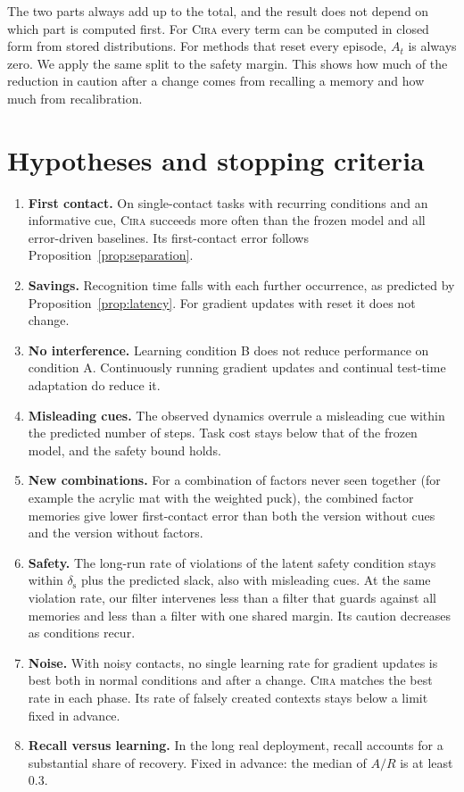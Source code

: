 \documentclass[10pt]{article}
\newcommand{\method}{\textsc{Cira}}
\begin{document}
The two parts always add up to the total, and the result does not depend on which part is computed
first. For \method{} every term can be computed in closed form from stored distributions. For methods
that reset every episode, $A_t$ is always zero. We apply the same split to the safety margin. This
shows how much of the reduction in caution after a change comes from recalling a memory and how much
from recalibration.

\section{Hypotheses and stopping criteria}

\begin{enumerate}[label=\textbf{H\arabic*},leftmargin=2.2em]
  \item \textbf{First contact.} On single-contact tasks with recurring conditions and an informative
  cue, \method{} succeeds more often than the frozen model and all error-driven baselines. Its
  first-contact error follows Proposition~\ref{prop:separation}.
  \item \textbf{Savings.} Recognition time falls with each further occurrence, as predicted by
  Proposition~\ref{prop:latency}. For gradient updates with reset it does not change.
  \item \textbf{No interference.} Learning condition B does not reduce performance on condition A.
  Continuously running gradient updates and continual test-time adaptation do reduce it.
  \item \textbf{Misleading cues.} The observed dynamics overrule a misleading cue within the predicted
  number of steps. Task cost stays below that of the frozen model, and the safety bound holds.
  \item \textbf{New combinations.} For a combination of factors never seen together (for example the
  acrylic mat with the weighted puck), the combined factor memories give lower first-contact error than
  both the version without cues and the version without factors.
  \item \textbf{Safety.} The long-run rate of violations of the latent safety condition stays within
  $\delta_{\mathrm s}$ plus the predicted slack, also with misleading cues. At the same violation rate,
  our filter intervenes less than a filter that guards against all memories and less than a filter
  with one shared margin. Its caution decreases as conditions recur.
  \item \textbf{Noise.} With noisy contacts, no single learning rate for gradient updates is best both
  in normal conditions and after a change. \method{} matches the best rate in each phase. Its rate of
  falsely created contexts stays below a limit fixed in advance.
  \item \textbf{Recall versus learning.} In the long real deployment, recall accounts for a substantial
  share of recovery. Fixed in advance: the median of $A/R$ is at least 0.3.
\end{enumerate}
\end{document}
